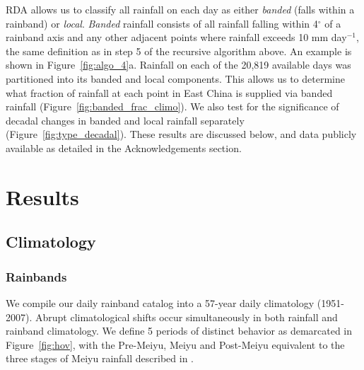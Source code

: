 \documentclass[9pt,twocolumn,twoside,lineno]{pnas-new}
\begin{document}
	RDA allows us to classify all rainfall on each day as either \textit{banded} (falls within a rainband) or \textit{local}. \textit{Banded} rainfall consists of all rainfall falling within 4$^{\circ}$ of a rainband axis and any other adjacent points where rainfall exceeds 10 mm day$^{-1}$, the same definition as in step 5 of the recursive algorithm above. An example is shown in Figure~\ref{fig:algo_4}a. Rainfall on each of the 20,819 available days was partitioned into its banded and local components. This allows us to determine what fraction of rainfall at each point in East China is supplied via banded rainfall (Figure~\ref{fig:banded_frac_climo}). We also test for the significance of decadal changes in banded and local rainfall separately (Figure~\ref{fig:type_decadal}). These results are discussed below, and data publicly available as detailed in the Acknowledgements section.
	

\section{Results}

\subsection{Climatology}

\subsubsection{Rainbands}

	We compile our daily rainband catalog into a 57-year daily climatology (1951-2007). Abrupt climatological shifts occur simultaneously in both rainfall and rainband climatology. We define 5 periods of distinct behavior as demarcated in Figure~\ref{fig:hov}, with the Pre-Meiyu, Meiyu and Post-Meiyu equivalent to the three stages of Meiyu rainfall described in \citet{Ding2005}.
\end{document}
